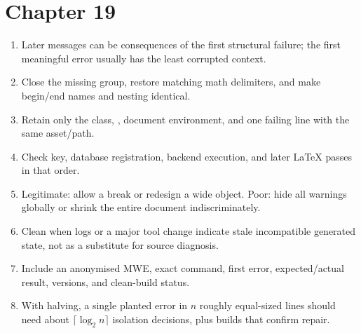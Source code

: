\section*{Chapter 19}
\begin{enumerate}[label=19.\arabic*,leftmargin=2.4em,itemsep=0.45em]
  \item Later messages can be consequences of the first structural failure; the
        first meaningful error usually has the least corrupted context.
  \item Close the missing group, restore matching math delimiters, and make
        begin/end names and nesting identical.
  \item Retain only the class, , document environment, and one
        failing  line with the same asset/path.
  \item Check key, database registration, backend execution, and later \LaTeX{}
        passes in that order.
  \item Legitimate: allow a break or redesign a wide object. Poor: hide all
        warnings globally or shrink the entire document indiscriminately.
  \item Clean when logs or a major tool change indicate stale incompatible
        generated state, not as a substitute for source diagnosis.
  \item Include an anonymised MWE, exact command, first error, expected/actual
        result, versions, and clean-build status.
  \item With halving, a single planted error in $n$ roughly equal-sized lines
        should need about $\lceil\log_2 n\rceil$ isolation decisions, plus builds
        that confirm repair.
\end{enumerate}


